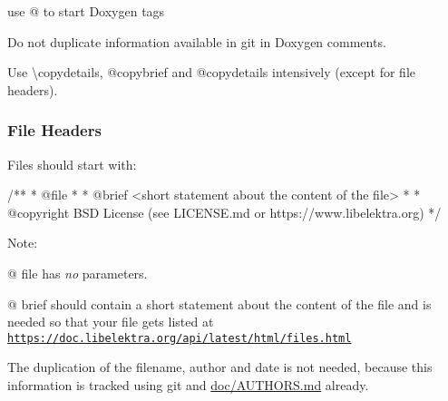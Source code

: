 \begin{DoxyItemize}
\item use {\ttfamily @} to start Doxygen tags
\item Do not duplicate information available in git in Doxygen comments.
\item Use {\ttfamily \textbackslash{}copydetails}, {\ttfamily @copybrief} and {\ttfamily @copydetails} intensively (except for file headers).
\end{DoxyItemize}

\subsubsection*{File Headers}

Files should start with\+:

\begin{DoxyVerb}        /**
         * @file
         *
         * @brief <short statement about the content of the file>
         *
         * @copyright BSD License (see LICENSE.md or https://www.libelektra.org)
         */\end{DoxyVerb}


Note\+:


\begin{DoxyItemize}
\item {\ttfamily @} {\ttfamily file} has {\itshape no} parameters.
\item {\ttfamily @} {\ttfamily brief} should contain a short statement about the content of the file and is needed so that your file gets listed at \href{https://doc.libelektra.org/api/latest/html/files.html}{\tt https\+://doc.\+libelektra.\+org/api/latest/html/files.\+html}
\end{DoxyItemize}

The duplication of the filename, author and date is not needed, because this information is tracked using git and \hyperlink{doc_AUTHORS_md}{doc/\+A\+U\+T\+H\+O\+RS.md} already. 